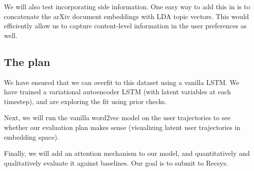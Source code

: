 We will also test incorporating side information. One easy way to add this in is to concatenate the arXiv document embeddings with LDA topic vectors. This would efficiently allow us to capture content-level information in the user preferences as well.

\subsection*{The plan}

We have ensured that we can overfit to this dataset using a vanilla LSTM. We have trained a variational autoencoder LSTM (with latent variables at each timestep), and are exploring the fit using prior checks.

Next, we will run the vanilla word2vec model on the user trajectories to see whether our evaluation plan makes sense (visualizing latent user trajectories in embedding space).

Finally, we will add an attention mechanism to our model, and quantitatively and qualitatively evaluate it against baselines. Our goal is to submit to Recsys.







